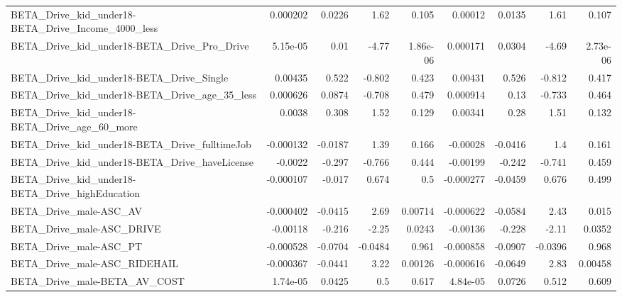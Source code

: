 \begin{tabular}{lrrrrrrrr}
BETA\_Drive\_kid\_under18-BETA\_Drive\_Income\_4000\_less &    0.000202 &       0.0226 &      1.62 &    0.105 &    0.00012 &      0.0135 &         1.61 &         0.107 \\
BETA\_Drive\_kid\_under18-BETA\_Drive\_Pro\_Drive        &    5.15e-05 &         0.01 &     -4.77 & 1.86e-06 &   0.000171 &      0.0304 &        -4.69 &      2.73e-06 \\
BETA\_Drive\_kid\_under18-BETA\_Drive\_Single           &     0.00435 &        0.522 &    -0.802 &    0.423 &    0.00431 &       0.526 &       -0.812 &         0.417 \\
BETA\_Drive\_kid\_under18-BETA\_Drive\_age\_35\_less      &    0.000626 &       0.0874 &    -0.708 &    0.479 &   0.000914 &        0.13 &       -0.733 &         0.464 \\
BETA\_Drive\_kid\_under18-BETA\_Drive\_age\_60\_more      &      0.0038 &        0.308 &      1.52 &    0.129 &    0.00341 &        0.28 &         1.51 &         0.132 \\
BETA\_Drive\_kid\_under18-BETA\_Drive\_fulltimeJob      &   -0.000132 &      -0.0187 &      1.39 &    0.166 &   -0.00028 &     -0.0416 &          1.4 &         0.161 \\
BETA\_Drive\_kid\_under18-BETA\_Drive\_haveLicense      &     -0.0022 &       -0.297 &    -0.766 &    0.444 &   -0.00199 &      -0.242 &       -0.741 &         0.459 \\
BETA\_Drive\_kid\_under18-BETA\_Drive\_highEducation    &   -0.000107 &       -0.017 &     0.674 &      0.5 &  -0.000277 &     -0.0459 &        0.676 &         0.499 \\
BETA\_Drive\_male-ASC\_AV                             &   -0.000402 &      -0.0415 &      2.69 &  0.00714 &  -0.000622 &     -0.0584 &         2.43 &         0.015 \\
BETA\_Drive\_male-ASC\_DRIVE                          &    -0.00118 &       -0.216 &     -2.25 &   0.0243 &   -0.00136 &      -0.228 &        -2.11 &        0.0352 \\
BETA\_Drive\_male-ASC\_PT                             &   -0.000528 &      -0.0704 &   -0.0484 &    0.961 &  -0.000858 &     -0.0907 &      -0.0396 &         0.968 \\
BETA\_Drive\_male-ASC\_RIDEHAIL                       &   -0.000367 &      -0.0441 &      3.22 &  0.00126 &  -0.000616 &     -0.0649 &         2.83 &       0.00458 \\
BETA\_Drive\_male-BETA\_AV\_COST                       &    1.74e-05 &       0.0425 &       0.5 &    0.617 &   4.84e-05 &      0.0726 &        0.512 &         0.609 \\

\end{tabular}
